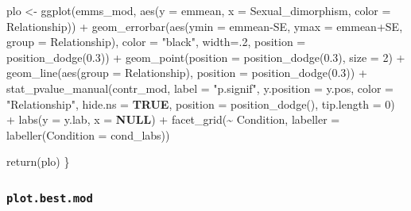 \documentclass[
  bookmarksnumbered]{article}
\newenvironment{Shaded}{\begin{snugshade}}{\end{snugshade}}
\newcommand{\AttributeTok}[1]{\textcolor[rgb]{0.80,0.80,0.80}{#1}}
\newcommand{\ConstantTok}[1]{\textcolor[rgb]{0.86,0.64,0.64}{\textbf{#1}}}
\newcommand{\DecValTok}[1]{\textcolor[rgb]{0.86,0.86,0.80}{#1}}
\newcommand{\FloatTok}[1]{\textcolor[rgb]{0.75,0.75,0.82}{#1}}
\newcommand{\FunctionTok}[1]{\textcolor[rgb]{0.94,0.94,0.56}{#1}}
\newcommand{\NormalTok}[1]{\textcolor[rgb]{0.80,0.80,0.80}{#1}}
\newcommand{\OtherTok}[1]{\textcolor[rgb]{0.94,0.94,0.56}{#1}}
\newcommand{\SpecialCharTok}[1]{\textcolor[rgb]{0.86,0.64,0.64}{#1}}
\newcommand{\StringTok}[1]{\textcolor[rgb]{0.80,0.58,0.58}{#1}}
\begin{document}
\begin{Shaded}
\begin{Highlighting}[]
\NormalTok{  plo }\OtherTok{\textless{}{-}} \FunctionTok{ggplot}\NormalTok{(emms\_mod, }\FunctionTok{aes}\NormalTok{(}\AttributeTok{y =}\NormalTok{ emmean, }\AttributeTok{x =}\NormalTok{ Sexual\_dimorphism, }\AttributeTok{color =}\NormalTok{ Relationship)) }\SpecialCharTok{+}
    \FunctionTok{geom\_errorbar}\NormalTok{(}\FunctionTok{aes}\NormalTok{(}\AttributeTok{ymin =}\NormalTok{ emmean}\SpecialCharTok{{-}}\NormalTok{SE,}
                      \AttributeTok{ymax =}\NormalTok{ emmean}\SpecialCharTok{+}\NormalTok{SE,}
                      \AttributeTok{group =}\NormalTok{ Relationship), }
                  \AttributeTok{color =} \StringTok{"black"}\NormalTok{,}
                  \AttributeTok{width=}\NormalTok{.}\DecValTok{2}\NormalTok{,}
                  \AttributeTok{position =} \FunctionTok{position\_dodge}\NormalTok{(}\FloatTok{0.3}\NormalTok{)) }\SpecialCharTok{+}
    \FunctionTok{geom\_point}\NormalTok{(}\AttributeTok{position =} \FunctionTok{position\_dodge}\NormalTok{(}\FloatTok{0.3}\NormalTok{), }\AttributeTok{size =} \DecValTok{2}\NormalTok{) }\SpecialCharTok{+}
    \FunctionTok{geom\_line}\NormalTok{(}\FunctionTok{aes}\NormalTok{(}\AttributeTok{group =}\NormalTok{ Relationship),}
              \AttributeTok{position =} \FunctionTok{position\_dodge}\NormalTok{(}\FloatTok{0.3}\NormalTok{)) }\SpecialCharTok{+} 
    \FunctionTok{stat\_pvalue\_manual}\NormalTok{(contr\_mod, }
                       \AttributeTok{label =} \StringTok{"p.signif"}\NormalTok{, }
                       \AttributeTok{y.position =}\NormalTok{ y.pos,}
                       \AttributeTok{color =} \StringTok{"Relationship"}\NormalTok{, }\AttributeTok{hide.ns =} \ConstantTok{TRUE}\NormalTok{,}
                       \AttributeTok{position =} \FunctionTok{position\_dodge}\NormalTok{(),}
                       \AttributeTok{tip.length =} \DecValTok{0}\NormalTok{) }\SpecialCharTok{+}
    \FunctionTok{labs}\NormalTok{(}\AttributeTok{y =}\NormalTok{ y.lab,}
         \AttributeTok{x =} \ConstantTok{NULL}\NormalTok{) }\SpecialCharTok{+}
    \FunctionTok{facet\_grid}\NormalTok{(}\SpecialCharTok{\textasciitilde{}}\NormalTok{ Condition,}
               \AttributeTok{labeller =} \FunctionTok{labeller}\NormalTok{(}\AttributeTok{Condition =}\NormalTok{ cond\_labs)) }
  
  \FunctionTok{return}\NormalTok{(plo)}
\NormalTok{\}}
\end{Highlighting}
\end{Shaded}

\subsubsection{\texorpdfstring{\texttt{plot.best.mod}}{plot.best.mod}}\label{plot.best.mod}
\end{document}
